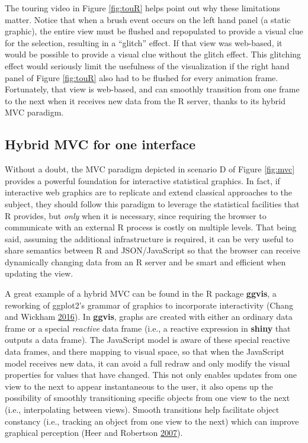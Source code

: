 \documentclass[12pt,]{isuthesis}
\begin{document}
The touring video in Figure \ref{fig:touR} helps point out why these
limitations matter. Notice that when a brush event occurs on the left
hand panel (a static graphic), the entire view must be flushed and
repopulated to provide a visual clue for the selection, resulting in a
``glitch'' effect. If that view was web-based, it would be possible to
provide a visual clue without the glitch effect. This glitching effect
would seriously limit the usefulness of the visualization if the right
hand panel of Figure \ref{fig:touR} also had to be flushed for every
animation frame. Fortunately, that view is web-based, and can smoothly
transition from one frame to the next when it receives new data from the
R server, thanks to its hybrid MVC paradigm.


\subsection{Hybrid MVC for one
interface}\label{hybrid-mvc-for-one-interface}

Without a doubt, the MVC paradigm depicted in scenario D of Figure
\ref{fig:mvc} provides a powerful foundation for interactive statistical
graphics. In fact, if interactive web graphics are to replicate and
extend classical approaches to the subject, they should follow this
paradigm to leverage the statistical facilities that R provides, but
\emph{only} when it is necessary, since requiring the browser to
communicate with an external R process is costly on multiple levels.
That being said, assuming the additional infrastructure is required, it
can be very useful to share semantics between R and JSON/JavaScript so
that the browser can receive dynamically changing data from an R server
and be smart and efficient when updating the view.

A great example of a hybrid MVC can be found in the R package
\textbf{ggvis}, a reworking of ggplot2's grammar of graphics to
incorporate interactivity (Chang and Wickham
\protect\hyperlink{ref-ggvis}{2016}). In \textbf{ggvis}, graphs are
created with either an ordinary data frame or a special \emph{reactive}
data frame (i.e., a reactive expression in \textbf{shiny} that outputs a
data frame). The JavaScript model is aware of these special reactive
data frames, and there mapping to visual space, so that when the
JavaScript model receives new data, it can avoid a full redraw and only
modify the visual properties for values that have changed. This not only
enables updates from one view to the next to appear instantaneous to the
user, it also opens up the possibility of smoothly transitioning
specific objects from one view to the next (i.e., interpolating between
views). Smooth transitions help facilitate object constancy (i.e.,
tracking an object from one view to the next) which can improve
graphical perception (Heer and Robertson
\protect\hyperlink{ref-animated-transitions}{2007}).
\end{document}
